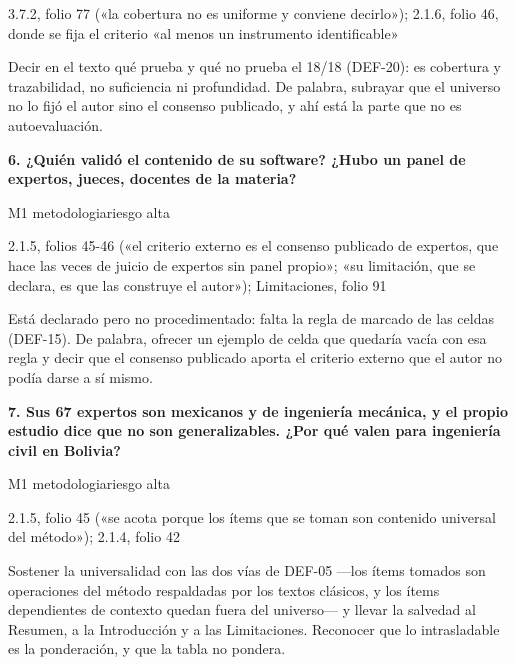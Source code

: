 {\small{}3.7.2, folio 77 («la cobertura no es uniforme y conviene decirlo»); 2.1.6, folio 46, donde se fija el criterio «al menos un instrumento identificable»\par}
{\small{}Decir en el texto qué prueba y qué no prueba el 18/\allowbreak{}18 (DEF-20): es cobertura y trazabilidad, no suficiencia ni profundidad. De palabra, subrayar que el universo no lo fijó el autor sino el consenso publicado, y ahí está la parte que no es autoevaluación.\par}
\vspace{5pt}
\noindent\casilla\textbf{6. ¿Quién validó el contenido de su software? ¿Hubo un panel de expertos, jueces, docentes de la materia?}\par
{\small\color{gris}\sffamily M1 metodologia\quad{}\quad riesgo alta}\par
{\small{}2.1.5, folios 45-46 («el criterio externo es el consenso publicado de expertos, que hace las veces de juicio de expertos sin panel propio»; «su limitación, que se declara, es que las construye el autor»); Limitaciones, folio 91\par}
{\small{}Está declarado pero no procedimentado: falta la regla de marcado de las celdas (DEF-15). De palabra, ofrecer un ejemplo de celda que quedaría vacía con esa regla y decir que el consenso publicado aporta el criterio externo que el autor no podía darse a sí mismo.\par}
\vspace{5pt}
\noindent\casilla\textbf{7. Sus 67 expertos son mexicanos y de ingeniería mecánica, y el propio estudio dice que no son generalizables. ¿Por qué valen para ingeniería civil en Bolivia?}\par
{\small\color{gris}\sffamily M1 metodologia\quad{}\quad riesgo alta}\par
{\small{}2.1.5, folio 45 («se acota porque los ítems que se toman son contenido universal del método»); 2.1.4, folio 42\par}
{\small{}Sostener la universalidad con las dos vías de DEF-05 —los ítems tomados son operaciones del método respaldadas por los textos clásicos, y los ítems dependientes de contexto quedan fuera del universo— y llevar la salvedad al Resumen, a la Introducción y a las Limitaciones. Reconocer que lo intrasladable es la ponderación, y que la tabla no pondera.\par}
